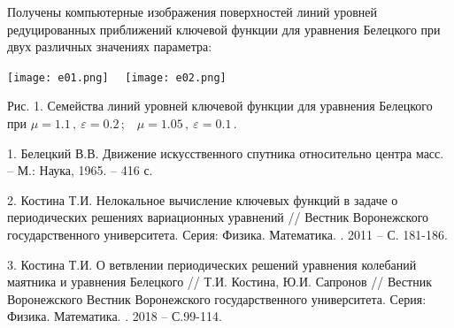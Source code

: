 Получены компьютерные изображения поверхностей линий уровней
редуцированных приближений ключевой функции для уравнения Белецкого при двух различных значениях параметра:

\begin{center}
\texttt{[image: e01.png]} \ \
\texttt{[image: e02.png]}

Рис. 1. Семейства линий уровней ключевой функции для уравнения Белецкого при {$\mu
= 1.1\,, \ \varepsilon=0.2\,;$ \ $\mu = 1.05\,, \
\varepsilon=0.1\,. $}

\end{center}






\litlist

1. Белецкий В.В. Движение искусственного спутника относительно центра масс.
-- М.: Наука, 1965. -- 416 с.


2. Костина Т.И. Нелокальное вычисление ключевых функций в задаче о
периодических решениях вариационных уравнений // Вестник
Воронежского государственного университета. Серия: Физика.
Математика. . 2011 -- С. 181-186.


3. Костина Т.И. О ветвлении периодических решений уравнения колебаний маятника и уравнения Белецкого // Т.И. Костина, Ю.И. Сапронов // Вестник Воронежского Вестник
Воронежского государственного университета. Серия: Физика.
Математика. \No 1. 2018 -- С.99-114.
